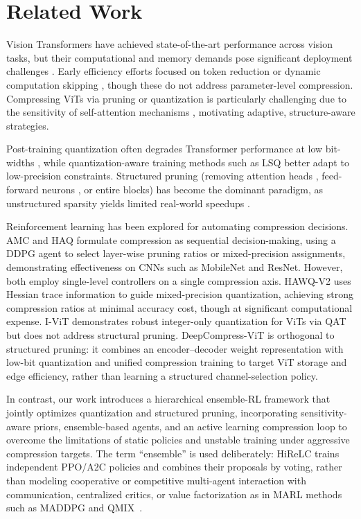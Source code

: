 \documentclass[preprint,12pt,authoryear]{elsarticle}
\begin{document}
\section{Related Work}

Vision Transformers have achieved state-of-the-art performance across vision tasks, but their computational and memory demands pose significant deployment challenges \citep{dosovitskiy2021,islam2022visiontransformer}. Early efficiency efforts focused on token reduction or dynamic computation skipping \citep{rao2021dynamicvit,ryoo2021tokenlearner}, though these do not address parameter-level compression. Compressing ViTs via pruning or quantization is particularly challenging due to the sensitivity of self-attention mechanisms \citep{lu2019transformer-dynamics}, motivating adaptive, structure-aware strategies.

Post-training quantization often degrades Transformer performance at low bit-widths \citep{bondarenko-2021-transformer-quantization}, while quantization-aware training methods such as LSQ \citep{esser2020learnedstepsizequantization} better adapt to low-precision constraints. Structured pruning (removing attention heads \citep{michel2019heads}, feed-forward neurons \citep{wang2020structuredpruning}, or entire blocks) has become the dominant paradigm, as unstructured sparsity yields limited real-world speedups \citep{gale2019sparsity}.

Reinforcement learning has been explored for automating compression decisions. AMC \citep{he2018amc} and HAQ \citep{wang2019haq} formulate compression as sequential decision-making, using a DDPG agent to select layer-wise pruning ratios or mixed-precision assignments, demonstrating effectiveness on CNNs such as MobileNet and ResNet. However, both employ single-level controllers on a single compression axis. HAWQ-V2 \citep{dong2020hawqv2} uses Hessian trace information to guide mixed-precision quantization, achieving strong compression ratios at minimal accuracy cost, though at significant computational expense. I-ViT \citep{li2023ivit} demonstrates robust integer-only quantization for ViTs via QAT but does not address structural pruning. DeepCompress-ViT \citep{ahmed2025deepcompress} is orthogonal to structured pruning: it combines an encoder--decoder weight representation with low-bit quantization and unified compression training to target ViT storage and edge efficiency, rather than learning a structured channel-selection policy.

In contrast, our work introduces a hierarchical ensemble-RL framework that jointly optimizes quantization and structured pruning, incorporating sensitivity-aware priors, ensemble-based agents, and an active learning compression loop to overcome the limitations of static policies and unstable training under aggressive compression targets. The term ``ensemble'' is used deliberately: HiReLC trains independent PPO/A2C policies and combines their proposals by voting, rather than modeling cooperative or competitive multi-agent interaction with communication, centralized critics, or value factorization as in MARL methods such as MADDPG and QMIX~\citep{lowe2017multiagent,rashid2018qmix}.
\end{document}
